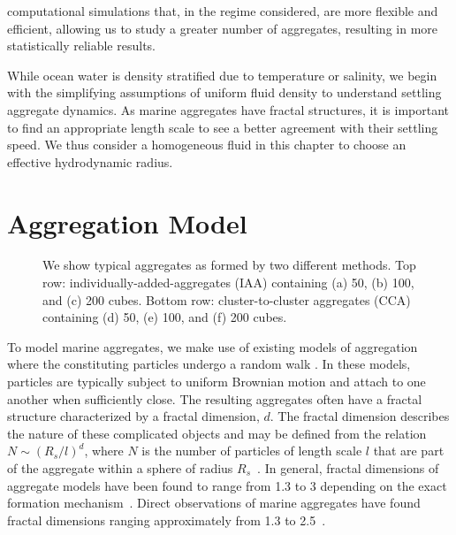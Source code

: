 computational simulations that, in the regime considered, are more flexible and efficient, allowing us to study a greater number of aggregates, resulting in more statistically reliable results. 
\par
While ocean water is density stratified due to temperature or salinity, we begin with the simplifying assumptions of uniform fluid density to understand settling aggregate dynamics. 
As marine aggregates have fractal structures, it is important to find an appropriate length scale to see a better agreement with their settling speed. We thus consider a homogeneous fluid in this chapter to choose an effective hydrodynamic radius. 



\section{Aggregation Model}
\label{sec_model}

\begin{figure}[ht]
\begin{center}
\end{center}
\caption{We show typical aggregates as formed by two different methods. Top row: individually-added-aggregates (IAA) containing (a) 50, (b) 100, and (c) 200 cubes. Bottom row: cluster-to-cluster aggregates (CCA) containing (d) 50, (e) 100, and (f) 200 cubes.}
\label{fig_rad_mass}
\end{figure}

To model marine aggregates, we make use of existing models of aggregation where the constituting particles undergo a random walk
\cite{rosenstock_cluster_1980, witten_diffusion-limited_1981,witten_tenuous_1986,kolb_anisotropic_1987}. 
In these models, particles are typically subject to uniform Brownian motion and attach to one another when 
sufficiently close. The resulting aggregates often have a fractal structure characterized by a fractal dimension, $d$. The fractal dimension describes the nature of these complicated objects and may be defined from the relation $N\sim(R_s/l)^d$, where $N$ is the number of particles of length scale $l$ that are part of the aggregate within a sphere of radius $R_s$~\cite{witten_tenuous_1986}. In general, fractal dimensions of aggregate models have been found to range from 1.3 to 3 depending on the exact formation 
mechanism~\cite{witten_diffusion-limited_1981, kolb_anisotropic_1987,gmachowski_calculation_2002}. 
Direct observations of marine aggregates have found fractal dimensions ranging approximately from 1.3 to 2.5~\cite{alldredge_situ_1988,jackson_aggregation_1998}.
   
